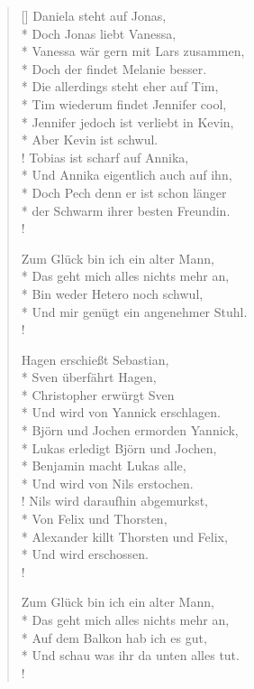 \documentclass[a4paper,12pt,notitlepage]{article}
\begin{document}
  \begin{verse}[\versewidth]
	  Daniela steht auf Jonas, \\*
	  Doch Jonas liebt Vanessa, \\*
		Vanessa wär gern mit Lars zusammen, \\*
		Doch der findet Melanie besser. \\*
		Die allerdings steht eher auf Tim, \\*
		Tim wiederum findet Jennifer cool, \\*
		Jennifer jedoch ist verliebt in Kevin, \\*
		Aber Kevin ist schwul. \\!
		Tobias ist scharf auf Annika, \\*
		Und Annika eigentlich auch auf ihn, \\*
		Doch Pech denn er ist schon länger \\*
		der Schwarm ihrer besten Freundin. \\!

		Zum Glück bin ich ein alter Mann, \\*
		Das geht mich alles nichts mehr an, \\*
		Bin weder Hetero noch schwul, \\*
		Und mir genügt ein angenehmer Stuhl. \\!

		Hagen erschießt Sebastian, \\*
		Sven überfährt Hagen, \\*
		Christopher erwürgt Sven \\*
		Und wird von Yannick erschlagen. \\*
		Björn und Jochen ermorden Yannick, \\*
		Lukas erledigt Björn und Jochen, \\*
		Benjamin macht Lukas alle, \\*
		Und wird von Nils erstochen. \\!
		Nils wird daraufhin abgemurkst, \\*
		Von Felix und Thorsten, \\*
		Alexander killt Thorsten und Felix, \\*
		Und wird erschossen. \\!

		Zum Glück bin ich ein alter Mann, \\*
		Das geht mich alles nichts mehr an, \\*
		Auf dem Balkon hab ich es gut, \\*
		Und schau was ihr da unten alles tut. \\!


\end{verse}
\end{document}
